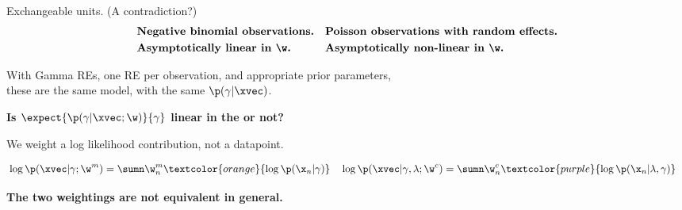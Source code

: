 \begin{frame}[t]{Exchangeable units.  (A contradiction?)}
    \vspace{-1em}
    \begin{align*}
    &\text{\textbf{Negative binomial observations.}}
    &
    &\text{\textbf{Poisson observations with random effects.}}
    \\
    &\text{\textbf{Asymptotically linear in $\w$.}}
    &
    &\text{\textbf{Asymptotically non-linear in $\w$.}}
    \end{align*}
    \begin{center}
        With Gamma REs, one RE per observation, and appropriate prior parameters,\\
        these are the same model, with the same $\p(\gamma \vert \xvec)$.
        
    \textbf{Is $\expect{\p(\gamma \vert \xvec; \w)}{\gamma}$
    linear in the 
    or not?}
    
    \spskip

    \textbf{}  We weight a log likelihood
    contribution, not a datapoint.

    \begin{align*}
        &\log \p(\xvec \vert \gamma; \w^{m}) =
            \sumn \w^{m}_n 
            \textcolor{orange}{\log \p(\x_n \vert \gamma)}
        &
        &\log \p(\xvec \vert \gamma, \lambda; \w^{c}) =
            \sumn \w^{c}_n 
            \textcolor{purple}{\log \p(\x_n \vert \lambda, \gamma)}
    \end{align*}
        

    \textbf{The two weightings are not equivalent in general.}

    
    \end{center}
\end{frame}


